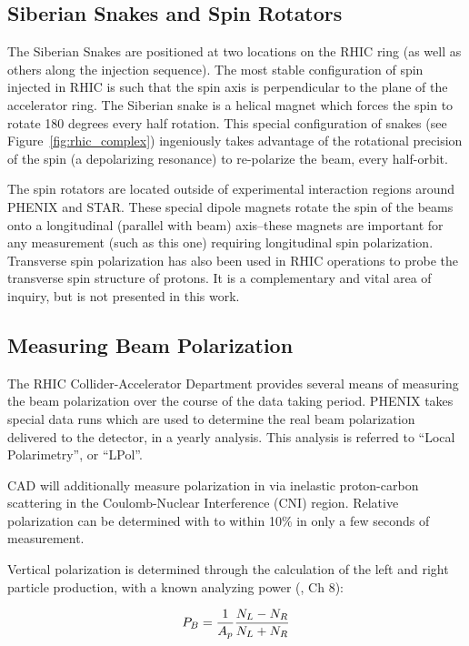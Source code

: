 \subsection{Siberian Snakes and Spin Rotators}
\label{sec:siberian_snakes}

The Siberian Snakes are positioned at two locations on the RHIC ring (as well as
others along the injection sequence). The most stable configuration of spin
injected in RHIC is such that the spin axis is perpendicular to the plane of the
accelerator ring. The Siberian snake is a helical magnet which forces the spin
to rotate 180 degrees every half rotation. This special configuration of snakes
(see Figure~\ref{fig:rhic_complex}) ingeniously takes advantage of the
rotational precision of the spin (a depolarizing resonance) to re-polarize the
beam, every half-orbit.

The spin rotators are located outside of experimental interaction regions around
PHENIX and STAR. These special dipole magnets rotate the spin of the beams onto
a longitudinal (parallel with beam) axis--these magnets are important for any
measurement (such as this one) requiring longitudinal spin polarization.
Transverse spin polarization has also been used in RHIC operations to probe the
transverse spin structure of protons. It is a complementary and vital area of
inquiry, but is not presented in this work. 

\subsection{Measuring Beam Polarization}

The RHIC Collider-Accelerator Department provides several means of measuring the
beam polarization over the course of the data taking period. PHENIX takes
special data runs which are used to determine the real beam polarization
delivered to the detector, in a yearly analysis. This analysis is referred to
``Local Polarimetry'', or ``LPol''.

CAD will additionally measure polarization in via inelastic proton-carbon
scattering in the Coulomb-Nuclear Interference (CNI) region. Relative
polarization can be determined with to within 10\% in only a few seconds of
measurement. 

Vertical polarization is determined through the calculation of the left and
right particle production, with a known analyzing power (\cite{RHIC2006}, Ch 8):

\begin{equation}
  P_B = {{1}\over{A_p}}{{N_L-N_R}\over{N_L+N_R}}
  \label{eq:rhic_polarization}
\end{equation}

